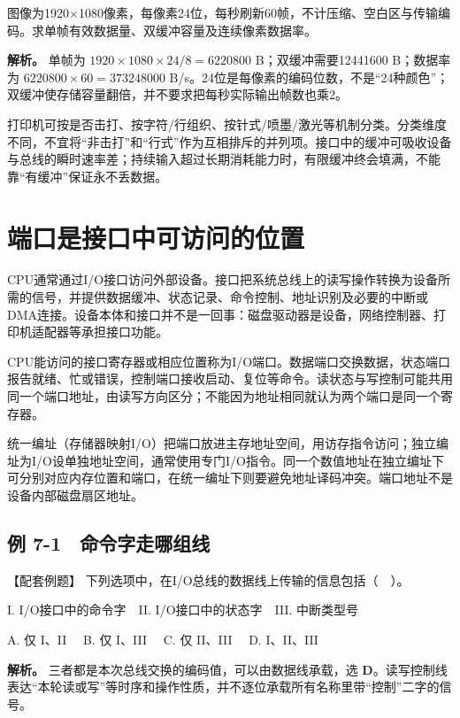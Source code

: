 \begin{example}[自拟：从分辨率算显存与数据率]

图像为1920\ensuremath{\times}1080像素，每像素24位，每秒刷新60帧，不计压缩、空白区与传输编码。求单帧有效数据量、双缓冲容量及连续像素数据率。

\end{example}

\textbf{解析。} 单帧为 \(1920\times1080\times24/8=6220800\) B；双缓冲需要12441600 B；数据率为 \(6220800\times60=373248000\) B/s。24位是每像素的编码位数，不是``24种颜色''；双缓冲使存储容量翻倍，并不要求把每秒实际输出帧数也乘2。

打印机可按是否击打、按字符/行组织、按针式/喷墨/激光等机制分类。分类维度不同，不宜将``非击打''和``行式''作为互相排斥的并列项。接口中的缓冲可吸收设备与总线的瞬时速率差；持续输入超过长期消耗能力时，有限缓冲终会填满，不能靠``有缓冲''保证永不丢数据。

\section{端口是接口中可访问的位置}\label{CO07-interface}

CPU通常通过I/O接口访问外部设备。接口把系统总线上的读写操作转换为设备所需的信号，并提供数据缓冲、状态记录、命令控制、地址识别及必要的中断或DMA连接。设备本体和接口并不是一回事：磁盘驱动器是设备，网络控制器、打印机适配器等承担接口功能。

CPU能访问的接口寄存器或相应位置称为I/O端口。数据端口交换数据，状态端口报告就绪、忙或错误，控制端口接收启动、复位等命令。读状态与写控制可能共用同一个端口地址，由读写方向区分；不能因为地址相同就认为两个端口是同一个寄存器。

统一编址（存储器映射I/O）把端口放进主存地址空间，用访存指令访问；独立编址为I/O设单独地址空间，通常使用专门I/O指令。同一个数值地址在独立编址下可分别对应内存位置和端口，在统一编址下则要避免地址译码冲突。端口地址不是设备内部磁盘扇区地址。

\subsection{例 7-1　命令字走哪组线}\label{CO07-example-1}

【配套例题】 下列选项中，在I/O总线的数据线上传输的信息包括（　）。

I. I/O接口中的命令字　II. I/O接口中的状态字　III. 中断类型号

A. 仅 I、II　 B. 仅 I、III　 C. 仅 II、III　 D. I、II、III

\textbf{解析。} 三者都是本次总线交换的编码值，可以由数据线承载，选 \textbf{D}。读写控制线表达``本轮读或写''等时序和操作性质，并不逐位承载所有名称里带``控制''二字的信号。

